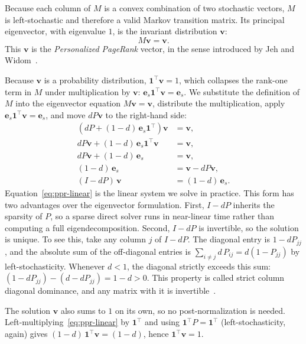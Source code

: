 \documentclass[conference]{IEEEtran}
\begin{document}
Because each column of $M$ is a convex combination of two
stochastic vectors, $M$ is left-stochastic and therefore a
valid Markov transition matrix. Its principal eigenvector,
with eigenvalue $1$, is the invariant distribution
$\mathbf{v}$:
\begin{equation}
  M \mathbf{v} = \mathbf{v}.
\end{equation}
This $\mathbf{v}$ is the \emph{Personalized PageRank} vector, in the
sense introduced by Jeh and Widom~\cite{jeh2003scaling}.

Because $\mathbf{v}$ is a probability distribution,
$\mathbf{1}^\top \mathbf{v} = 1$, which collapses the rank-one term
in $M$ under multiplication by $\mathbf{v}$:
$\mathbf{e}_s \mathbf{1}^\top \mathbf{v} = \mathbf{e}_s$.
We substitute the definition of $M$ into the eigenvector equation
$M\mathbf{v} = \mathbf{v}$, distribute the multiplication, apply
$\mathbf{e}_s \mathbf{1}^\top \mathbf{v} = \mathbf{e}_s$, and move
$dP\mathbf{v}$ to the right-hand side:
\begin{align}
  \left(dP + (1-d)\,\mathbf{e}_s \mathbf{1}^\top\right)\mathbf{v}
    &= \mathbf{v}, \\
  dP\mathbf{v} + (1-d)\,\mathbf{e}_s \mathbf{1}^\top \mathbf{v}
    &= \mathbf{v}, \\
  dP\mathbf{v} + (1-d)\,\mathbf{e}_s
    &= \mathbf{v}, \\
  (1-d)\,\mathbf{e}_s
    &= \mathbf{v} - dP\mathbf{v}, \\
  (I - dP)\,\mathbf{v}
    &= (1-d)\,\mathbf{e}_s. \label{eq:ppr-linear}
\end{align}
Equation~\eqref{eq:ppr-linear} is the linear system we solve in
practice.
This form has two advantages over the eigenvector formulation.
First, $I - dP$ inherits the sparsity of $P$, so a sparse direct
solver runs in near-linear time rather than computing a full
eigendecomposition. Second, $I - dP$ is invertible, so the
solution is unique. To see this, take any column $j$ of $I - dP$.
The diagonal entry is $1 - dP_{jj}$, and the absolute sum of the
off-diagonal entries is $\sum_{i \neq j} d \, P_{ij} = d(1 -
P_{jj})$ by left-stochasticity. Whenever $d < 1$, the diagonal
strictly exceeds this sum: $(1 - dP_{jj}) - (d - dP_{jj}) = 1 - d
> 0$. This property is called strict column diagonal dominance,
and any matrix with it is invertible~\cite{langville2004deeper}.

The solution $\mathbf{v}$ also sums to $1$ on its own, so no
post-normalization is needed. Left-multiplying~\eqref{eq:ppr-linear}
by $\mathbf{1}^\top$ and using $\mathbf{1}^\top P = \mathbf{1}^\top$
(left-stochasticity, again) gives $(1-d)\,\mathbf{1}^\top
\mathbf{v} = (1-d)$, hence $\mathbf{1}^\top \mathbf{v} = 1$.
\end{document}
